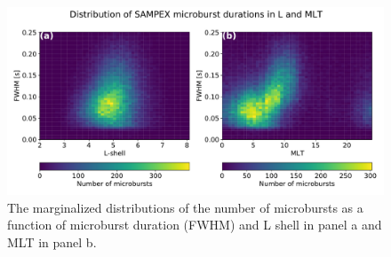 \documentclass[draft]{agujournal2019}
\begin{document}
\begin{figure}
\noindent\includegraphics[width=\textwidth]{figures/fig3.pdf}
\caption{The marginalized distributions of the number of microbursts as a function of microburst duration (FWHM) and L shell in panel a and MLT in panel b.}
\label{fig3}
\end{figure}
\end{document}

